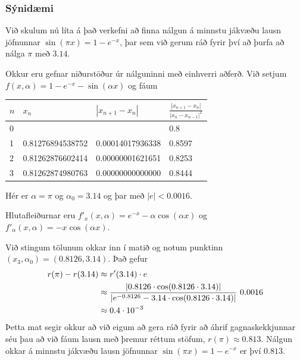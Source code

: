 \documentclass[a4paper,10pt,icelandic]{sphinxmanual}
\begin{document}
\subsubsection{Sýnidæmi}
\label{kafli01:id2}
Við skulum nú líta á það verkefni að finna nálgun á minnstu jákvæðu
lausn jöfnunnar \(\sin(\pi x)=1-e^{-x}\), þar sem við gerum ráð
fyrir því að þurfa að nálga \(\pi\) með \(3.14\).

Okkur eru gefnar niðurstöður úr nálguninni með einhverri aðferð. Við
setjum \(f(x,\alpha)=1-e^{-x}-\sin(\alpha x)\) og fáum

\begin{tabulary}{\linewidth}{|L|L|L|L|}
\hline
\textsf{\relax 
\(n\)
} & \textsf{\relax 
\(x_n\)
} & \textsf{\relax 
\(|x_{n+1}-x_n|\)
} & \textsf{\relax 
\(\frac{|x_{n+1}-x_n|}{|x_n-x_{n-1}|^2}\)
}\\
 &  &  & 
0.8
\\
 & 
0.81276894538752
 & 
0.00014017936338
 & 
0.8597
\\
 & 
0.81262876602414
 & 
0.00000001621651
 & 
0.8253
\\
 & 
0.81262874980763
 & 
0.00000000000000
 & 
0.8444
\\
\hline\end{tabulary}


Hér er \(\alpha=\pi\) og \(\alpha_0=3.14\) og þar með
\(|e|<0.0016\).

Hlutafleiðurnar eru \(f'_x(x,\alpha)=e^{-x}-\alpha\cos(\alpha x)\)
og \(f'_\alpha(x,\alpha)=-x\cos(\alpha x)\).

Við stingum tölunum okkar inn í matið og notum punktinn
\((x_3,\alpha_0)=(0.8126,3.14)\). Það gefur
\begin{gather}
\begin{split}\begin{aligned}
    r(\pi)-r(3.14)&\approx r'(3.14) \cdot e\\
    &\approx
    \dfrac{|0.8126\cdot \cos(0.8126\cdot 3.14)|}{|e^{-0.8126}-3.14
    \cdot \cos(0.8126 \cdot 3.14)|}\
    0.0016 \\
    &\approx 0.4\cdot 10^{-3}\end{aligned}\end{split}\notag
\end{gather}
Þetta mat segir okkur að við eigum að gera ráð fyrir að áhrif
gagnaskekkjunnar séu þau að við fáum lausn með þremur réttum stöfum,
\(r(\pi) \approx 0.813\). Nálgun okkar á minnstu jákvæðu lausn
jöfnunnar \(\sin(\pi
x)=1-e^{-x}\) er því \(0.813\).
\end{document}
